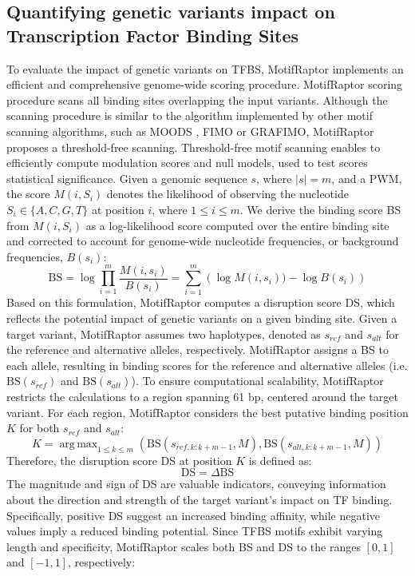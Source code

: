 \documentclass[a4paper, titlepage, openright]{book}
\DeclareMathOperator*{\argmax}{arg\,max}
\newcommand{\grafimo}{GRAFIMO\xspace}
\newcommand{\motifraptor}{MotifRaptor\xspace}
\begin{document}
\subsection{Quantifying genetic variants impact on Transcription Factor Binding Sites}\label{subsection:motifraptor-quantifying-genetic-variants-impact}
To evaluate the impact of genetic variants on TFBS, \motifraptor implements an efficient and comprehensive genome-wide scoring procedure. \motifraptor scoring procedure scans all binding sites overlapping the input variants. Although the scanning procedure is similar to the algorithm implemented by other motif scanning algorithms, such as MOODS \citep{korhonen2009moods}, FIMO \citep{grant2011fimo} or \grafimo \citep{tognon2021grafimo}, \motifraptor proposes a threshold-free scanning. Threshold-free motif scanning enables to efficiently compute modulation scores and null models, used to test scores statistical significance. Given a genomic sequence $s$, where $|s|=m$, and a PWM, the score $M(i,S_{i})$ denotes the likelihood of observing the nucleotide $S_{i}\in\{A,C,G,T\}$ at position $i$, where $1 \leq i \leq m.$ We derive the binding score BS from $M(i,S_{i})$ as a log-likelihood score computed over the entire binding site and corrected to account for genome-wide nucleotide frequencies, or background frequencies, $B(s_{i})$:
\[
	\text{BS} = \log{\prod^{m}_{i=1}{\frac{M(i,s_{i})}{B(s_{i})}}} = \sum^{m}_{i=1}{(\log{M(i, s_{i}))} - \log{B(s_{i})})}
\] 
Based on this formulation, \motifraptor computes a disruption score DS, which reflects the potential impact of genetic variants on a given binding site. Given a target variant, \motifraptor assumes two haplotypes, denoted as $s_{ref}$ and $s_{alt}$ for the reference and alternative alleles, respectively. \motifraptor assigns a BS to each allele, resulting in binding scores for the reference and alternative alleles (i.e.  $\text{BS}(s_{ref})$ and $\text{BS}(s_{alt})$). To ensure computational scalability, \motifraptor restricts the calculations to a region spanning 61 bp, centered around the target variant. For each region, \motifraptor considers the best putative binding position $K$ for both $s_{ref}$ and $s_{alt}$:
\[
	K = \argmax_{1 \leq k \leq m}(\text{BS}(s_{ref, k:k+m-1}, M), \text{BS}(s_{alt, k:k+m-1}, M))
\]
Therefore, the disruption score DS at position $K$ is defined as:
\[
	\text{DS} = \Delta \text{BS}
\]
The magnitude and sign of DS are valuable indicators, conveying information about the direction and strength of the target variant's impact on TF binding. Specifically, positive DS suggest an increased binding affinity, while negative values imply a reduced binding potential. Since TFBS motifs exhibit varying length and specificity, \motifraptor scales both BS and DS to the ranges $[0,1]$ and $[-1,1]$, respectively:
\end{document}
